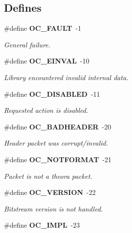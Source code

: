 \subsection*{Defines}
\begin{CompactItemize}
\item 
\#define {\bf OC\_\-FAULT}~-1\label{theora_8h_95aff598c4af451822e7e836b3886cbf}

\begin{CompactList}\small\item\em General failure. \item\end{CompactList}\item 
\#define {\bf OC\_\-EINVAL}~-10\label{theora_8h_06a281a54a00da88abf1a3b29ec11e4a}

\begin{CompactList}\small\item\em Library encountered invalid internal data. \item\end{CompactList}\item 
\#define {\bf OC\_\-DISABLED}~-11\label{theora_8h_b2bc670dc664c72ea6fcbaf9deda3476}

\begin{CompactList}\small\item\em Requested action is disabled. \item\end{CompactList}\item 
\#define {\bf OC\_\-BADHEADER}~-20\label{theora_8h_9d583a6c9a30e48ec7d4ea937f769614}

\begin{CompactList}\small\item\em Header packet was corrupt/invalid. \item\end{CompactList}\item 
\#define {\bf OC\_\-NOTFORMAT}~-21\label{theora_8h_ed82978e76177264a6b8fc3278697c33}

\begin{CompactList}\small\item\em Packet is not a theora packet. \item\end{CompactList}\item 
\#define {\bf OC\_\-VERSION}~-22\label{theora_8h_1398927f9660a187ae02d93022795ae8}

\begin{CompactList}\small\item\em Bitstream version is not handled. \item\end{CompactList}\item 
\#define {\bf OC\_\-IMPL}~-23\label{theora_8h_5d58ee606f97079e94c30549584fd7c8}


\end{CompactItemize}
